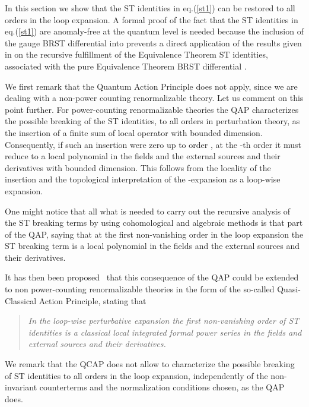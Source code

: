 \documentclass[a4paper,11pt]{article}
\begin{document}
In this section we show that 
the ST identities in eq.(\ref{st1}) can be restored
to all orders in the loop expansion. 
A formal proof of the fact that the ST identities in eq.(\ref{st1}) 
are anomaly-free at the quantum level is needed because
the inclusion of the gauge BRST differential \coordHE{} into \coordHE{}
prevents a direct application of the results given in \cite{ET}
on the recursive fulfillment of the Equivalence Theorem ST identities,
associated with the pure Equivalence Theorem 
BRST differential \myHighlight{$\delta$}\coordHE{}.

We first remark that
the Quantum Action Principle \cite{qap1,qap2,qap3,qap4,Piguet:er} does not apply,
since we are dealing with a non-power counting renormalizable theory.
%
Let us comment on this point further.
For  power-counting renormalizable theories the QAP characterizes
 the possible breaking of the ST identities, to all orders in perturbation theory,
 as the insertion of a finite sum of local operator with bounded dimension.
Consequently, if such an insertion were zero up to order \coordHE{},
 at the \coordHE{}-th order it must reduce to a local polynomial in the fields
 and the external sources and their derivatives with bounded dimension.
This follows from the locality of the insertion and the topological
 interpretation of the \myHighlight{$\hbar$}\coordHE{}-expansion as a loop-wise expansion.

One might notice that all what is needed to carry out the recursive analysis
 of the ST breaking terms by using cohomological and 
 algebraic methods is that part
 of the QAP, saying that at the first non-vanishing order
 in the loop expansion the ST breaking term is a local polynomial
 in the fields and the external sources and their derivatives.

It has then been proposed~\cite{Stora2000} that this consequence
of the QAP could be extended to non power-counting renormalizable
theories in the form of the so-called 
Quasi-Classical Action Principle, stating that
%
\begin{quotation}
\noindent
{\em
In the loop-wise perturbative expansion the first non-vanishing order
 of ST identities is a classical local integrated formal power
 series in the fields and external sources and their derivatives.}
\end{quotation}

We remark that the QCAP does not allow to characterize the possible
breaking of ST identities to all orders in the loop expansion,
independently of the non-invariant counterterms and the normalization
conditions chosen, as the QAP does.
\end{document}
